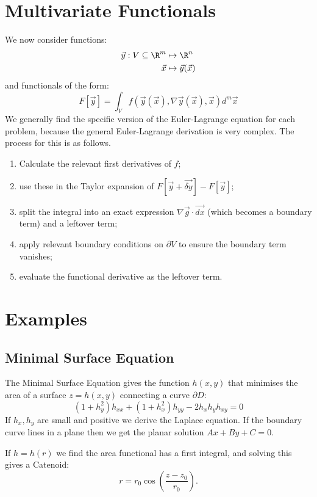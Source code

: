 \documentclass[../Main.tex]{subfiles}
\begin{document}
\section{Multivariate Functionals}
We now consider functions:
\begin{align*}
    \vec{y} : V \subseteq \R^m &\mapsto \R^n\\
    \vec{x} &\mapsto \vec{y}(\vec{x})
\end{align*}
and functionals of the form:
\begin{equation*}
    F[\vec{y}] = \int_V f(\vec{y}(\vec{x}), \nabla \vec{y}(\vec{x}), \vec{x}) d^m\vec{x}
\end{equation*}
We generally find the specific version of the Euler-Lagrange equation for each problem, because the general Euler-Lagrange derivation is very complex. The process for this is as follows.
\begin{enumerate}
    \item Calculate the relevant first derivatives of $f$;
    \item use these in the Taylor expansion of $F[\vec{y} + \vec{\delta y}] - F[\vec{y}]$;
    \item split the integral into an exact expression $\nabla \vec{g} \cdot \vec{dx}$ (which becomes a boundary term) and a leftover term;
    \item apply relevant boundary conditions on $\partial V$ to ensure the boundary term vanishes;
    \item evaluate the functional derivative as the leftover term.
\end{enumerate}
\section{Examples}
\subsection{Minimal Surface Equation}
The Minimal Surface Equation gives the function $h(x, y)$ that minimises the area of a surface $z = h(x,y)$ connecting a curve $\partial D$:
\begin{equation*}
    (1 + h_y^2) h_{xx} + (1 + h_x^2) h_{yy} - 2h_x h_y h_{xy} = 0
\end{equation*}
If $h_x, h_y$ are small and positive we derive the Laplace equation. If the boundary curve lines in a plane then we get the planar solution $Ax + By + C = 0$.

If $h = h(r)$ we find the area functional has a first integral, and solving this gives a Catenoid:
\begin{equation*}
    r = r_0 \cos(\frac{z - z_0}{r_0}).
\end{equation*}
\end{document}
